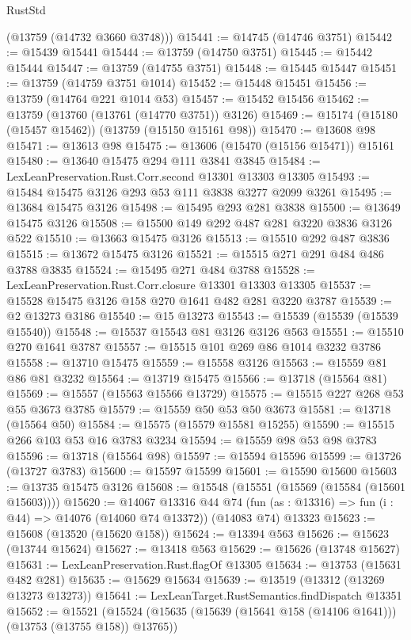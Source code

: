 \begin{lexlean}{RustStd}
\begin{coremodule}
      (@13759 (@14732 @3660 @3748)))
@15441 := @14745 (@14746 @3751)
@15442 := @15439 @15441
@15444 := @13759 (@14750 @3751)
@15445 := @15442 @15444
@15447 := @13759 (@14755 @3751)
@15448 := @15445 @15447
@15451 := @13759 (@14759 @3751 @1014)
@15452 := @15448 @15451
@15456 := @13759 (@14764 @221 @1014 @53)
@15457 := @15452 @15456
@15462 := @13759 (@13760 (@13761 (@14770 @3751)) @3126)
@15469 := @15174 (@15180 (@15457 @15462)) (@13759 (@15150 @15161 @98))
@15470 := @13608 @98
@15471 := @13613 @98
@15475 := @13606 (@15470 (@15156 @15471)) @15161
@15480 := @13640 @15475 @294 @111 @3841 @3845
@15484 := LexLeanPreservation.Rust.Corr.second @13301 @13303 @13305
@15493 := @15484 @15475 @3126 @293 @53 @111 @3838 @3277 @2099 @3261
@15495 := @13684 @15475 @3126
@15498 := @15495 @293 @281 @3838
@15500 := @13649 @15475 @3126
@15508 := @15500 @149 @292 @487 @281 @3220 @3836 @3126 @522
@15510 := @13663 @15475 @3126
@15513 := @15510 @292 @487 @3836
@15515 := @13672 @15475 @3126
@15521 := @15515 @271 @291 @484 @486 @3788 @3835
@15524 := @15495 @271 @484 @3788
@15528 := LexLeanPreservation.Rust.Corr.closure @13301 @13303 @13305
@15537 := @15528 @15475 @3126 @158 @270 @1641 @482 @281 @3220 @3787
@15539 := @2 @13273 @3186
@15540 := @15 @13273
@15543 := @15539 (@15539 (@15539 @15540))
@15548 := @15537 @15543 @81 @3126 @3126 @563
@15551 := @15510 @270 @1641 @3787
@15557 := @15515 @101 @269 @86 @1014 @3232 @3786
@15558 := @13710 @15475
@15559 := @15558 @3126
@15563 := @15559 @81 @86 @81 @3232
@15564 := @13719 @15475
@15566 := @13718 (@15564 @81)
@15569 := @15557 (@15563 @15566 @13729)
@15575 := @15515 @227 @268 @53 @55 @3673 @3785
@15579 := @15559 @50 @53 @50 @3673
@15581 := @13718 (@15564 @50)
@15584 := @15575 (@15579 @15581 @15255)
@15590 := @15515 @266 @103 @53 @16 @3783 @3234
@15594 := @15559 @98 @53 @98 @3783
@15596 := @13718 (@15564 @98)
@15597 := @15594 @15596
@15599 := @13726 (@13727 @3783)
@15600 := @15597 @15599
@15601 := @15590 @15600
@15603 := @13735 @15475 @3126
@15608 := @15548 (@15551 (@15569 (@15584 (@15601 @15603))))
@15620 := @14067
    @13316
    @44
    @74
    (fun (as : @13316) => fun (i : @44) => @14076 (@14060 @74 @13372))
    (@14083 @74)
    @13323
@15623 := @15608 (@13520 (@15620 @158))
@15624 := @13394 @563
@15626 := @15623 (@13744 @15624)
@15627 := @13418 @563
@15629 := @15626 (@13748 @15627)
@15631 := LexLeanPreservation.Rust.flagOf @13305
@15634 := @13753 (@15631 @482 @281)
@15635 := @15629 @15634
@15639 := @13519 (@13312 (@13269 @13273 @13273))
@15641 := LexLeanTarget.RustSemantics.findDispatch @13351
@15652 := @15521
    (@15524 (@15635 (@15639 (@15641 @158 (@14106 @1641))) (@13753 (@13755 @158)) @13765))

\end{coremodule}
\end{lexlean}
